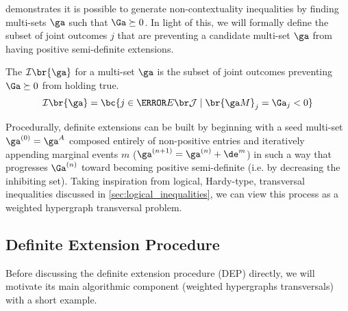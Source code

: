 \documentclass[aps, 10pt, english, twoside, pra, nofootinbib, longbibliography]{revtex4-1}
\begin{document}
     demonstrates it is possible to generate non-contextuality inequalities by finding multi-sets $\ga$ such that $\Ga \succeq 0$. In light of this, we will formally define the subset of joint outcomes $j$ that are preventing a candidate multi-set $\ga$ from having positive semi-definite extensions.

    \begin{definition}
        The  $\inhibit\br{\ga}$ for a multi-set $\ga$ is the subset of joint outcomes preventing $\Ga \succeq 0$ from holding true.
        \[ \inhibit\br{\ga} = \bc{j \in \Events{\jointvar} \mid \br{\ga \tcdot M}_j = \Ga_j < 0} \]
    \end{definition}

    Procedurally, definite extensions can be built by beginning with a seed multi-set $\ga^{(0)} = \ga^{A}$ composed entirely of non-positive entries and iteratively appending marginal events $m$ ($\ga^{(n+1)} = \ga^{(n)} + \de^{m}$) in such a way that progresses $\Ga^{(n)}$ toward becoming positive semi-definite (i.e. by decreasing the inhibiting set). Taking inspiration from logical, Hardy-type, transversal inequalities discussed in \cref{sec:logical_inequalities}, we can view this process as a weighted hypergraph transversal problem.

    \subsection{Definite Extension Procedure}
    \label{sec:dep}
    Before discussing the definite extension procedure (DEP) directly, we will motivate its main algorithmic component (weighted hypergraphs transversals) with a short example.
\end{document}
